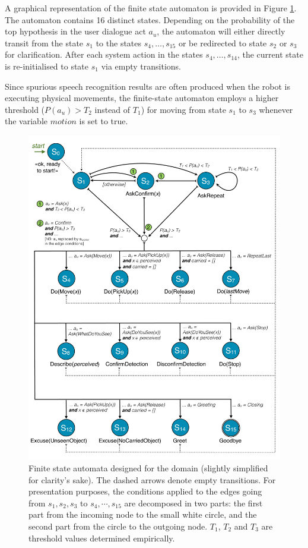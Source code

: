 A graphical representation of the finite state automaton is provided in Figure \ref{fig:fsa-exp3}.  The automaton contains 16 distinct states.  Depending on the probability of the top hypothesis in the user dialogue act $a_u$, the automaton will either directly transit from the state $s_1$ to the states $s_4, \dots, s_{15}$ or be redirected to state $s_2$ or $s_3$ for clarification. After each system action in the states $s_4, \dots, s_{14}$, the current state is re-initialised to state $s_1$ via empty transitions. 

Since spurious speech recognition results are often produced when the robot is executing physical movements, the finite-state automaton employs a higher threshold ($P(a_u) > T_2$ instead of $T_1$) for moving from state $s_1$ to $s_3$ whenever the variable $\mathit{motion}$ is set to true.


\begin{figure}[p]
\centering
\includegraphics[scale=0.36]{imgs/fsa-exp3.pdf} 
\caption{Finite state automata designed for the domain (slightly simplified for clarity's sake). The dashed arrows denote empty transitions. For presentation purposes, the conditions applied to the edges going from $s_1,s_2,s_3$ to $s_4, \cdots, s_{15}$ are decomposed in two parts: the first part from the incoming node to the small white circle, and the second part from the circle to the outgoing node. $T_1$, $T_2$ and $T_3$ are threshold values determined empirically.}
\label{fig:fsa-exp3}
\end{figure}


